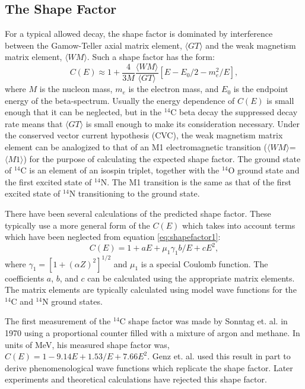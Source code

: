 \subsection{The Shape Factor}\label{sec:shape_factor}
For a typical allowed decay, the shape factor is dominated by interference between the Gamow-Teller axial matrix element, $\langle GT \rangle$ and the weak magnetism matrix element, $\langle WM \rangle$. Such a shape factor has the form\cite{C14_Kuzminov,C14_Garcia,C14_Wietfeldt,beta_Calaprice}:
\begin{equation}\label{eq:shapefactor1}
C(E)\approx1+\frac{4}{3M}\frac{\langle WM \rangle}{\langle GT \rangle}[E-E_0/2-m_e^2/E],
\end{equation}
where $M$ is the nucleon mass, $m_e$ is the electron mass, and $E_0$ is the endpoint energy of the beta-spectrum. Usually the energy dependence of $C(E)$ is small enough that it can be neglected, but in the $^{14}$C beta decay the suppressed decay rate means that $\langle GT \rangle$ is small enough to make its consideration necessary. Under the conserved vector current hypothesis (CVC), the weak magnetism matrix element can be analogized to that of an M1 electromagnetic transition ($\langle WM \rangle$=$\langle M1 \rangle$) for the purpose of calculating the expected shape factor. The ground state of $^{14}$C is an element of an isospin triplet, together with the $^{14}$O ground state and the first excited state of $^{14}$N. The M1 transition is the same as that of the first excited state of $^{14}$N transitioning to the ground state.

There have been several calculations of the predicted shape factor\cite{C14_Garcia,C14_Wietfeldt,C14_Genz}. These typically use a more general form of the $C(E)$ which takes into account terms which have been neglected from equation \ref{eq:shapefactor1}:
\begin{equation}\label{eq:shapefactor2}
C(E)=1+aE+\mu_1\gamma_1b/E+cE^2,
\end{equation}
where $\gamma_1=[1+(\alpha Z)^2]^{1/2}$ and $\mu_1$ is a special Coulomb function. The coefficients $a$, $b$, and $c$ can be calculated using the appropriate matrix elements. The matrix elements are typically calculated using model wave functions for the $^{14}$C and $^{14}$N ground states.

The first measurement of the $^{14}$C shape factor was made by Sonntag et. al. in 1970 using a proportional counter filled with a mixture of argon and methane\cite{C14_Sonntag}. In units of MeV, his measured shape factor was, $C(E)=1-9.14E+1.53/E+7.66E^2$. Genz et. al.\cite{C14_Genz} used this result in part to derive phenomenological wave functions which replicate the shape factor. Later experiments and theoretical calculations have rejected this shape factor.

